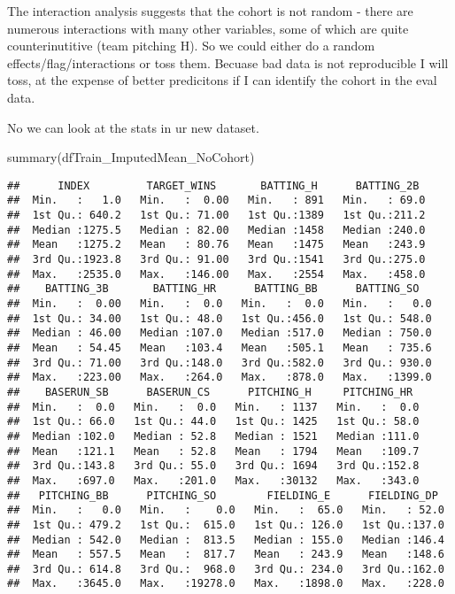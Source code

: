 \documentclass[
]{article}
\newenvironment{Shaded}{\begin{snugshade}}{\end{snugshade}}
\newcommand{\FunctionTok}[1]{\textcolor[rgb]{0.00,0.00,0.00}{#1}}
\newcommand{\NormalTok}[1]{#1}
\begin{document}
The interaction analysis suggests that the cohort is not random - there
are numerous interactions with many other variables, some of which are
quite counterinutitive (team pitching H). So we could either do a random
effects/flag/interactions or toss them. Becuase bad data is not
reproducible I will toss, at the expense of better predicitons if I can
identify the cohort in the eval data.

No we can look at the stats in ur new dataset.

\begin{Shaded}
\begin{Highlighting}[]
\FunctionTok{summary}\NormalTok{(dfTrain\_ImputedMean\_NoCohort)}
\end{Highlighting}
\end{Shaded}

\begin{verbatim}
##      INDEX         TARGET_WINS       BATTING_H      BATTING_2B   
##  Min.   :   1.0   Min.   :  0.00   Min.   : 891   Min.   : 69.0  
##  1st Qu.: 640.2   1st Qu.: 71.00   1st Qu.:1389   1st Qu.:211.2  
##  Median :1275.5   Median : 82.00   Median :1458   Median :240.0  
##  Mean   :1275.2   Mean   : 80.76   Mean   :1475   Mean   :243.9  
##  3rd Qu.:1923.8   3rd Qu.: 91.00   3rd Qu.:1541   3rd Qu.:275.0  
##  Max.   :2535.0   Max.   :146.00   Max.   :2554   Max.   :458.0  
##    BATTING_3B       BATTING_HR      BATTING_BB      BATTING_SO    
##  Min.   :  0.00   Min.   :  0.0   Min.   :  0.0   Min.   :   0.0  
##  1st Qu.: 34.00   1st Qu.: 48.0   1st Qu.:456.0   1st Qu.: 548.0  
##  Median : 46.00   Median :107.0   Median :517.0   Median : 750.0  
##  Mean   : 54.45   Mean   :103.4   Mean   :505.1   Mean   : 735.6  
##  3rd Qu.: 71.00   3rd Qu.:148.0   3rd Qu.:582.0   3rd Qu.: 930.0  
##  Max.   :223.00   Max.   :264.0   Max.   :878.0   Max.   :1399.0  
##    BASERUN_SB      BASERUN_CS      PITCHING_H     PITCHING_HR   
##  Min.   :  0.0   Min.   :  0.0   Min.   : 1137   Min.   :  0.0  
##  1st Qu.: 66.0   1st Qu.: 44.0   1st Qu.: 1425   1st Qu.: 58.0  
##  Median :102.0   Median : 52.8   Median : 1521   Median :111.0  
##  Mean   :121.1   Mean   : 52.8   Mean   : 1794   Mean   :109.7  
##  3rd Qu.:143.8   3rd Qu.: 55.0   3rd Qu.: 1694   3rd Qu.:152.8  
##  Max.   :697.0   Max.   :201.0   Max.   :30132   Max.   :343.0  
##   PITCHING_BB      PITCHING_SO        FIELDING_E      FIELDING_DP   
##  Min.   :   0.0   Min.   :    0.0   Min.   :  65.0   Min.   : 52.0  
##  1st Qu.: 479.2   1st Qu.:  615.0   1st Qu.: 126.0   1st Qu.:137.0  
##  Median : 542.0   Median :  813.5   Median : 155.0   Median :146.4  
##  Mean   : 557.5   Mean   :  817.7   Mean   : 243.9   Mean   :148.6  
##  3rd Qu.: 614.8   3rd Qu.:  968.0   3rd Qu.: 234.0   3rd Qu.:162.0  
##  Max.   :3645.0   Max.   :19278.0   Max.   :1898.0   Max.   :228.0
\end{verbatim}
\end{document}
